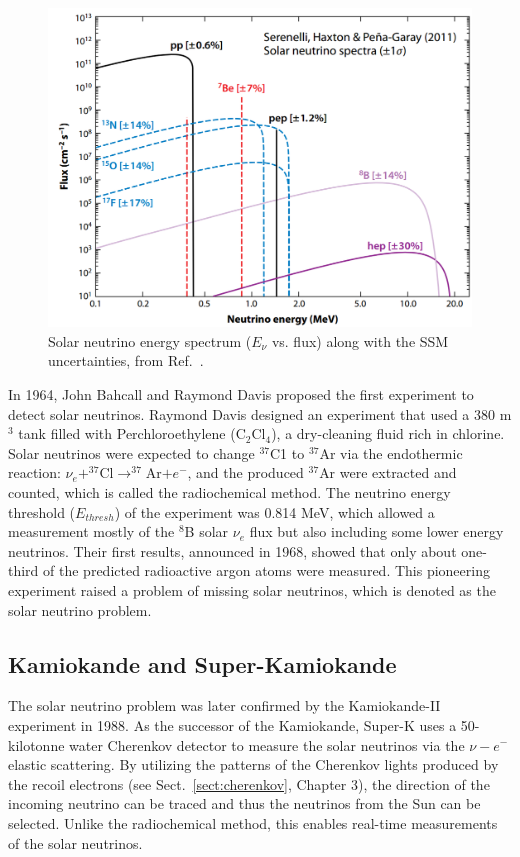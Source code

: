 \begin{figure}[htbp]
	\centering	
	\includegraphics[width=12cm]{haxton09.png}
	\caption[Solar neutrino energy spectrum.]{Solar neutrino energy spectrum ($E_\nu$ vs. flux) along with the SSM uncertainties, from Ref.~\cite{haxton2013solar}.}
	\label{fig:haxton2013plot}
\end{figure}

In 1964, John Bahcall and Raymond Davis proposed the first experiment to detect solar neutrinos\cite{bahcall1964solar,davis1964solar}. Raymond Davis designed an experiment that used a 380 m$^3$ tank filled with Perchloroethylene (C$_2$Cl$_4$), a dry-cleaning fluid rich in chlorine. Solar neutrinos were expected to change $^{37}$C1 to $^{37}$Ar via the endothermic reaction: $\nu_e+^{37}$Cl$\to^{37}$Ar$+e^-$, and the produced $^{37}$Ar were extracted and counted, which is called the radiochemical method. The neutrino energy threshold ($E_{thresh}$) of the experiment was 0.814 MeV, which allowed a measurement mostly of the $^8$B solar $\nu_e$ flux but also including some lower energy neutrinos\cite{davis1964solar}. Their first results, announced in 1968, showed that only about one-third of the predicted radioactive argon atoms were measured\cite{davis1968search}. This pioneering experiment raised a problem of missing solar neutrinos, which is denoted as the solar neutrino problem.

\subsection{Kamiokande and Super-Kamiokande}\label{sect:superKsolarnu}
The solar neutrino problem was later confirmed by the Kamiokande-II experiment in 1988\cite{superKwebsite}. As the successor of the Kamiokande, Super-K uses a 50-kilotonne water Cherenkov detector to measure the solar neutrinos via the $\nu-e^-$ elastic scattering. By utilizing the patterns of the Cherenkov lights produced by the recoil electrons (see Sect.~\ref{sect:cherenkov}, Chapter 3), the direction of the incoming neutrino can be traced and thus the neutrinos from the Sun can be selected. Unlike the radiochemical method, this enables real-time measurements of the solar neutrinos.

